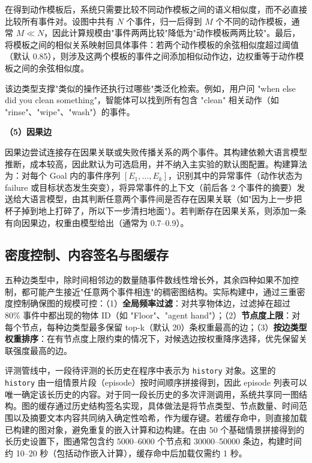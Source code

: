 在得到动作模板后，系统只需要比较不同动作模板之间的语义相似度，而不必直接比较所有事件对。设图中共有 $N$ 个事件，归一后得到 $M$ 个不同的动作模板，通常 $M \ll N$，因此计算规模由"事件两两比较"降低为"动作模板两两比较"。最后，将模板之间的相似关系映射回具体事件：若两个动作模板的余弦相似度超过阈值（默认 0.85），则涉及这两个模板的事件之间添加相似动作边，边权重等于动作模板之间的余弦相似度。

该边类型支撑"类似的操作还执行过哪些"类泛化检索。例如，用户问 "when else did you clean something"，智能体可以找到所有包含 "clean" 相关动作（如 "rinse"、"wipe"、"wash"）的事件。

\textbf{（5）因果边}

因果边尝试连接存在因果关联或失败传播关系的两个事件。其构建依赖大语言模型推断，成本较高，因此默认为可选启用，并不纳入主实验的默认图配置。构建算法为：对每个 Goal 内的事件序列 $[E_1, \ldots, E_k]$，识别其中的异常事件（动作状态为 failure 或目标状态发生突变），将异常事件的上下文（前后各 2 个事件的摘要）发送给大语言模型，由其判断任意两个事件间是否存在因果关联（如"因为上一步把杯子掉到地上打碎了，所以下一步清扫地面"）。若判断存在因果关系，则添加一条有向因果边，权重由模型给出（通常为 0.7–0.9）。

\subsection{密度控制、内容签名与图缓存}

五种边类型中，除时间相邻边的数量随事件数线性增长外，其余四种如果不加控制，都可能产生接近"任意两个事件相连"的稠密图结构。实际构建中，通过三重密度控制确保图的规模可控：（1）\textbf{全局频率过滤}：对共享物体边，过滤掉在超过 80\% 事件中都出现的物体 ID（如 "Floor"、"agent hand"）；（2）\textbf{节点度上限}：对每个节点，每种边类型最多保留 top-k（默认 20）条权重最高的边；（3）\textbf{按边类型权重排序}：在有节点度上限约束的情况下，对候选边按权重降序选择，优先保留关联强度最高的边。

评测管线中，一段待评测的长历史在程序中表示为 \texttt{history} 对象。这里的 \texttt{history} 由一组情景片段（episode）按时间顺序拼接得到，因此 episode 列表可以唯一确定该长历史的内容。对于同一段长历史的多次评测调用，系统共享同一图结构。图的缓存通过历史结构签名实现，具体做法是将节点类型、节点数量、时间范围以及摘要文本内容共同纳入确定性哈希，作为缓存键。若缓存命中，则直接加载已构建的图对象，避免重复的嵌入计算和边构建。在由 50 个基础情景拼接得到的长历史设置下，图通常包含约 5000–6000 个节点和 30000–50000 条边，构建时间约 10–20 秒（包括动作嵌入计算），缓存命中后加载仅需约 1 秒。

